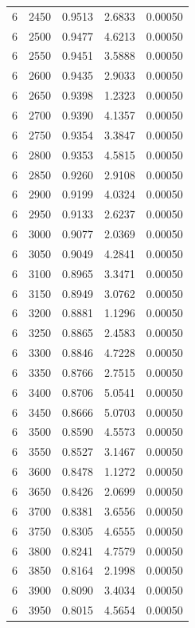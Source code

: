 \begin{longtable}{ccccc}
    6 & 2450 & 0.9513 & 2.6833 & 0.00050 \\
    6 & 2500 & 0.9477 & 4.6213 & 0.00050 \\
    6 & 2550 & 0.9451 & 3.5888 & 0.00050 \\
    6 & 2600 & 0.9435 & 2.9033 & 0.00050 \\
    6 & 2650 & 0.9398 & 1.2323 & 0.00050 \\
    6 & 2700 & 0.9390 & 4.1357 & 0.00050 \\
    6 & 2750 & 0.9354 & 3.3847 & 0.00050 \\
    6 & 2800 & 0.9353 & 4.5815 & 0.00050 \\
    6 & 2850 & 0.9260 & 2.9108 & 0.00050 \\
    6 & 2900 & 0.9199 & 4.0324 & 0.00050 \\
    6 & 2950 & 0.9133 & 2.6237 & 0.00050 \\
    6 & 3000 & 0.9077 & 2.0369 & 0.00050 \\
    6 & 3050 & 0.9049 & 4.2841 & 0.00050 \\
    6 & 3100 & 0.8965 & 3.3471 & 0.00050 \\
    6 & 3150 & 0.8949 & 3.0762 & 0.00050 \\
    6 & 3200 & 0.8881 & 1.1296 & 0.00050 \\
    6 & 3250 & 0.8865 & 2.4583 & 0.00050 \\
    6 & 3300 & 0.8846 & 4.7228 & 0.00050 \\
    6 & 3350 & 0.8766 & 2.7515 & 0.00050 \\
    6 & 3400 & 0.8706 & 5.0541 & 0.00050 \\
    6 & 3450 & 0.8666 & 5.0703 & 0.00050 \\
    6 & 3500 & 0.8590 & 4.5573 & 0.00050 \\
    6 & 3550 & 0.8527 & 3.1467 & 0.00050 \\
    6 & 3600 & 0.8478 & 1.1272 & 0.00050 \\
    6 & 3650 & 0.8426 & 2.0699 & 0.00050 \\
    6 & 3700 & 0.8381 & 3.6556 & 0.00050 \\
    6 & 3750 & 0.8305 & 4.6555 & 0.00050 \\
    6 & 3800 & 0.8241 & 4.7579 & 0.00050 \\
    6 & 3850 & 0.8164 & 2.1998 & 0.00050 \\
    6 & 3900 & 0.8090 & 3.4034 & 0.00050 \\
    6 & 3950 & 0.8015 & 4.5654 & 0.00050 \\

\end{longtable}

